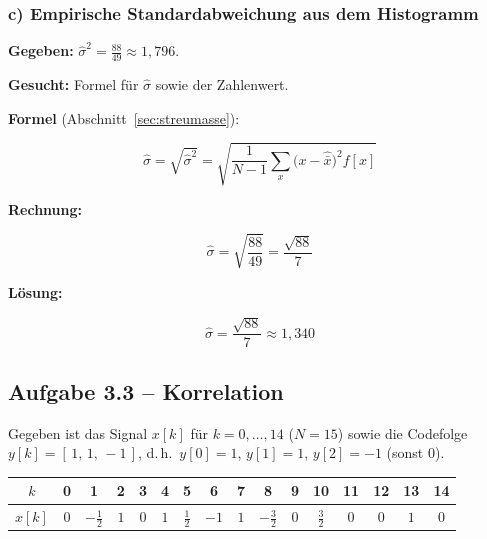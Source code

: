 \subsubsection*{c) Empirische Standardabweichung aus dem Histogramm}

\begin{beispiel}

\textbf{Gegeben:} $\hat{\sigma}^2 = \tfrac{88}{49} \approx 1{,}796$.

\textbf{Gesucht:} Formel für $\hat{\sigma}$ sowie der Zahlenwert.

\textbf{Formel} (Abschnitt~\ref{sec:streumasse}):

$$
\hat{\sigma} = \sqrt{\hat{\sigma}^2}
= \sqrt{\frac{1}{N-1} \sum_{x} \bigl(x - \hat{\bar{x}}\bigr)^2 f[x]}
$$

\textbf{Rechnung:}

$$
\hat{\sigma} = \sqrt{\frac{88}{49}} = \frac{\sqrt{88}}{7}
$$

\textbf{Lösung:}

$$
\boxed{\;\hat{\sigma} = \frac{\sqrt{88}}{7} \approx 1{,}340\;}
$$

\end{beispiel}

\subsection*{Aufgabe 3.3 – Korrelation}

Gegeben ist das Signal $x[k]$ für $k = 0, \ldots, 14$ ($N = 15$) sowie die
Codefolge $y[k] = [\,1,\, 1,\, -1\,]$, d.\,h.\ $y[0] = 1$, $y[1] = 1$,
$y[2] = -1$ (sonst $0$).

\begin{center}
\renewcommand{\arraystretch}{1.2}
\begin{tabular}{c|ccccccccccccccc}
$k$    & 0 & 1 & 2 & 3 & 4 & 5 & 6 & 7 & 8 & 9 & 10 & 11 & 12 & 13 & 14 \\
\hline
$x[k]$ & $0$ & $-\tfrac12$ & $1$ & $0$ & $1$ & $\tfrac12$ & $-1$ & $1$ & $-\tfrac32$
       & $0$ & $\tfrac32$ & $0$ & $0$ & $1$ & $0$ \\
\end{tabular}
\end{center}

